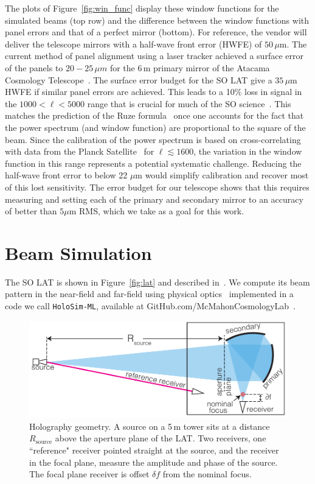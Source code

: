 The plots of Figure~\ref{fig:win_func} display these window functions for the simulated beams (top row) and the difference between the window functions with panel errors and that of a perfect mirror (bottom).  For reference, the vendor will deliver the telescope mirrors with a half-wave front error (HWFE) of $50\,\mu$m.  The current method of panel alignment using a laser tracker achieved a surface error of the panels to $20-25\,\mu  m$ for the 6\,m primary mirror of the Atacama Cosmology Telescope~\cite{act_inst}.  The surface error budget for the SO LAT give a $35\,\mu$m HWFE if similar panel errors are achieved.  This leads to a 10\% loss in signal in the $1000<\ell < 5000$ range that is crucial for much of the SO science~\cite{so_science}.  This matches the prediction of the Ruze formula~\cite{ruze} once one accounts for the fact that the power spectrum (and window function) are proportional to the square of the beam.  Since the calibration of the power spectrum is based on cross-correlating with data from the Planck Satellite~\cite{planck_data} for $\ell \lesssim 1600$, the variation in the window function in this range represents a potential systematic challenge.  Reducing the half-wave front error to below 22 $\mu$m would simplify calibration and recover most of this lost sensitivity.  The error budget for our telescope shows that this requires measuring and setting each of the primary and secondary mirror to an accuracy of better than $5 \mu$m RMS, which we take as a goal for this work.

\section{Beam Simulation}
\label{sec:simulate}
The SO LAT is shown in Figure~\ref{fig:lat} and described in~\cite{2021RNAAS...5..100X}.  We compute its beam pattern in the near-field and far-field using physical optics~\cite{hecht,Gudmundsson:21} implemented in a code we call \verb|HoloSim-ML|, available at GitHub.com/McMahonCosmologyLab~\cite{McMahonCosmologyLab}.

\begin{figure}
    \centering
    \includegraphics[width = .9\textwidth]{Figures/holography_geo3.pdf}
    \caption{Holography geometry. A source on a 5\,m tower sits at a distance $ R_{\text{source}}$ above the aperture plane of the LAT. Two receivers, one ``reference" receiver pointed straight at the source, and the receiver in the focal plane, measure the amplitude and phase of the source. The focal plane receiver is offset $\delta f$ from the nominal focus.}
    \label{fig:hologeo}
\end{figure}

